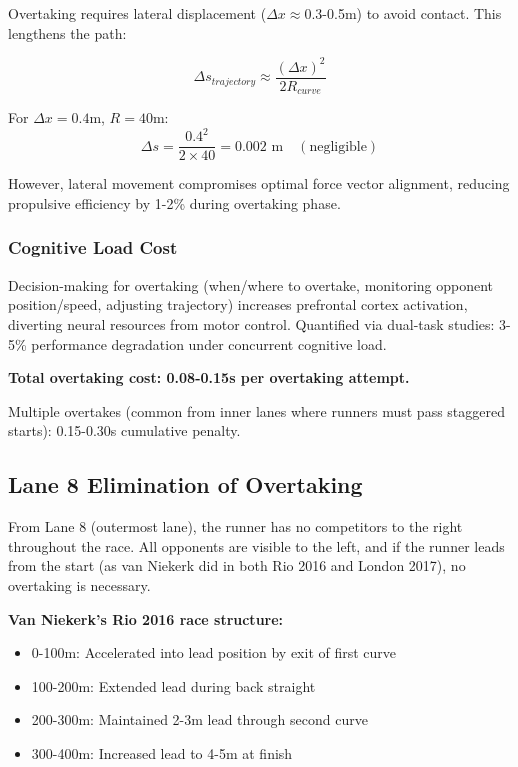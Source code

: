Overtaking requires lateral displacement ($\Delta x \approx 0.3$-0.5m) to avoid contact. This lengthens the path:

\begin{equation}
\Delta s_{trajectory} \approx \frac{(\Delta x)^2}{2R_{curve}}
\end{equation}

For $\Delta x = 0.4$m, $R = 40$m:
\begin{equation}
\Delta s = \frac{0.4^2}{2 \times 40} = 0.002 \text{ m} \quad (\text{negligible})
\end{equation}

However, lateral movement compromises optimal force vector alignment, reducing propulsive efficiency by 1-2\% during overtaking phase.

\subsubsection{Cognitive Load Cost}

Decision-making for overtaking (when/where to overtake, monitoring opponent position/speed, adjusting trajectory) increases prefrontal cortex activation, diverting neural resources from motor control. Quantified via dual-task studies: 3-5\% performance degradation under concurrent cognitive load.

\textbf{Total overtaking cost: 0.08-0.15s per overtaking attempt.}

Multiple overtakes (common from inner lanes where runners must pass staggered starts): 0.15-0.30s cumulative penalty.

\subsection{Lane 8 Elimination of Overtaking}

From Lane 8 (outermost lane), the runner has no competitors to the right throughout the race. All opponents are visible to the left, and if the runner leads from the start (as van Niekerk did in both Rio 2016 and London 2017), no overtaking is necessary.

\textbf{Van Niekerk's Rio 2016 race structure:}
\begin{itemize}
    \item 0-100m: Accelerated into lead position by exit of first curve
    \item 100-200m: Extended lead during back straight
    \item 200-300m: Maintained 2-3m lead through second curve
    \item 300-400m: Increased lead to 4-5m at finish
\end{itemize}

